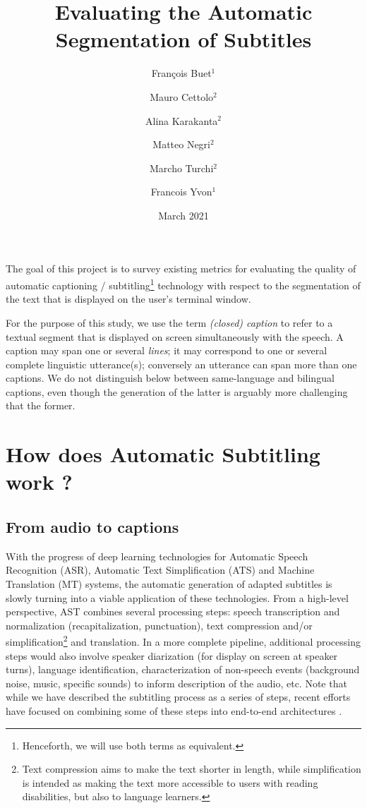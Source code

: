 \documentclass{article}
\title{Evaluating the Automatic Segmentation of Subtitles}
\author{François Buet$^1$ \and Mauro Cettolo$^2$ \and Alina Karakanta$^2$ \and  Matteo Negri$^2$ \and  Marcho Turchi$^2$ \and  Francois Yvon$^1$}
\date{March 2021}
\begin{document}
\maketitle

The goal of this project is to survey existing metrics for evaluating the quality of automatic captioning / subtitling\footnote{Henceforth, we will use both terms as equivalent.} technology with respect to the segmentation of the text that is displayed on the user's terminal window.

For the purpose of this study, we use the term \emph{(closed) caption} to refer to a textual segment that is  displayed on screen simultaneously with the speech. A caption may span one or several \emph{lines}; it may correspond to one or several complete linguistic utterance(s); conversely an utterance can span more than one captions. We do not distinguish below between same-language and bilingual captions, even though the generation of the latter is arguably more challenging that the former.

\section{How does Automatic Subtitling work ?}

\subsection{From audio to captions}
With the progress of deep learning technologies for Automatic Speech Recognition (ASR), Automatic Text Simplification (ATS) and Machine Translation (MT) systems, the automatic generation of adapted subtitles is slowly turning into a viable application of these technologies. From a high-level perspective, AST combines several processing steps: speech transcription and normalization (recapitalization, punctuation), text compression and/or simplification\footnote{Text compression aims to make the text shorter in length, while simplification is intended as making the text more accessible to users with reading disabilities, but also to language learners.} and translation. In a more complete pipeline, additional processing steps would also involve speaker diarization (for display on screen at speaker turns), language identification, characterization of non-speech events (background noise, music, specific sounds) to inform description of the audio, etc. Note that while we have described  the subtitling process as a series of steps, 
recent efforts have focused on combining some of these steps into end-to-end architectures \cite{liu-etal-2020-adapting,lakew-et-al-2019,niehues-2020}.   
\end{document}
